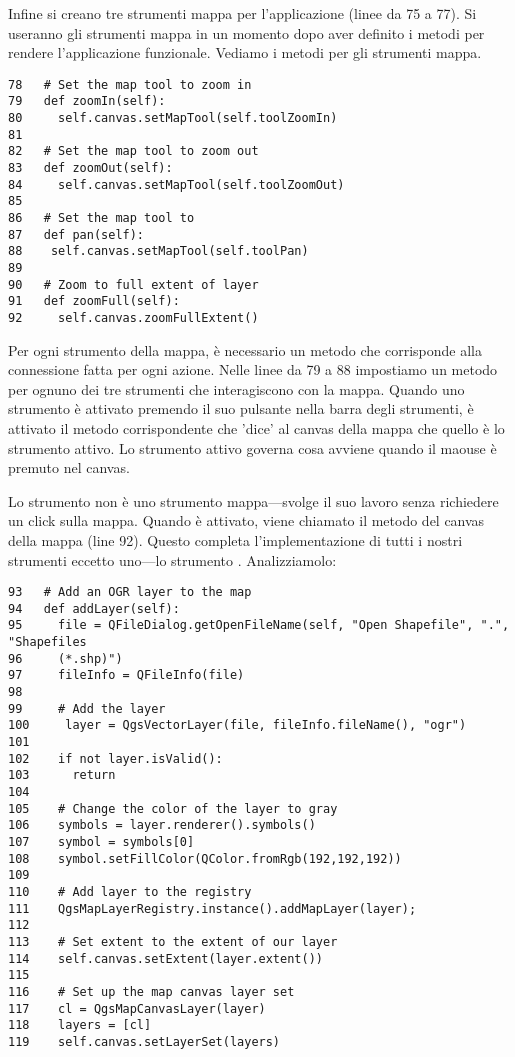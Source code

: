 Infine si creano tre strumenti mappa per l'applicazione (linee da 75 a
77). Si useranno gli strumenti mappa in un momento dopo aver definito i metodi per rendere l'applicazione funzionale. Vediamo i metodi per gli strumenti mappa.

\begin{verbatim}
78   # Set the map tool to zoom in
79   def zoomIn(self):
80     self.canvas.setMapTool(self.toolZoomIn)
81 
82   # Set the map tool to zoom out
83   def zoomOut(self):
84     self.canvas.setMapTool(self.toolZoomOut)
85 
86   # Set the map tool to 
87   def pan(self):
88    self.canvas.setMapTool(self.toolPan)
89 
90   # Zoom to full extent of layer
91   def zoomFull(self):
92     self.canvas.zoomFullExtent()
\end{verbatim}

Per ogni strumento della mappa, è necessario un metodo che corrisponde alla connessione fatta per ogni azione. Nelle linee da 79 a 88 impostiamo un metodo per ognuno dei tre strumenti che interagiscono con la mappa. Quando uno strumento è attivato premendo il suo pulsante nella barra degli strumenti, è attivato il metodo corrispondente che 'dice' al canvas della mappa che quello è lo strumento attivo. Lo strumento attivo governa cosa avviene quando il maouse è premuto nel canvas.

Lo strumento  non è uno strumento mappa---svolge il suo lavoro senza richiedere un  click sulla mappa. Quando è attivato, viene chiamato il metodo del canvas della mappa
 (line 92).  Questo completa l'implementazione di tutti i nostri strumenti eccetto uno---lo strumento . %
Analizziamolo:


\begin{verbatim}
93   # Add an OGR layer to the map
94   def addLayer(self):
95     file = QFileDialog.getOpenFileName(self, "Open Shapefile", ".", "Shapefiles
96     (*.shp)")
97     fileInfo = QFileInfo(file)
98 
99     # Add the layer
100     layer = QgsVectorLayer(file, fileInfo.fileName(), "ogr")
101
102    if not layer.isValid():
103      return
104
105    # Change the color of the layer to gray
106    symbols = layer.renderer().symbols()
107    symbol = symbols[0]
108    symbol.setFillColor(QColor.fromRgb(192,192,192))
109
110    # Add layer to the registry
111    QgsMapLayerRegistry.instance().addMapLayer(layer);
112
113    # Set extent to the extent of our layer
114    self.canvas.setExtent(layer.extent())
115
116    # Set up the map canvas layer set
117    cl = QgsMapCanvasLayer(layer)
118    layers = [cl]
119    self.canvas.setLayerSet(layers)
\end{verbatim}

